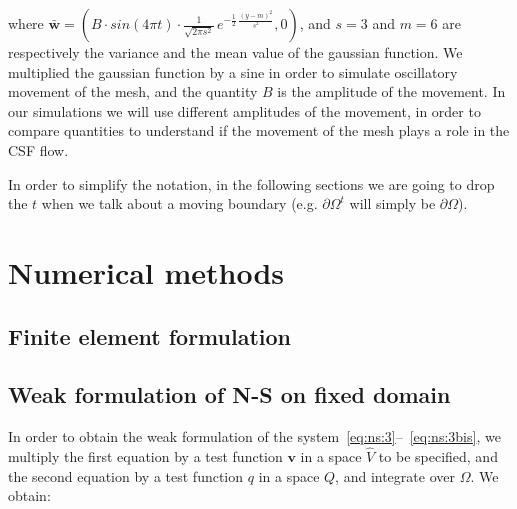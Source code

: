 \documentclass[a4paper,11pt,openright,twoside]{book}
\begin{document}
where $\bar{\mathbf{w}} = (B \cdot sin(4\pi t) \cdot \frac{1}{\sqrt{2 \pi s^2}} \, e^{- \frac{1}{2} \, \frac{(y - m)^2}{s^2}}  , 0)$, and $s = 3$ and $m = 6$ are respectively the variance and the mean value of the gaussian function. We multiplied the gaussian function by a sine in order to simulate oscillatory movement of the mesh, and the quantity $B$ is the amplitude of the movement. In our simulations we will use different amplitudes of the movement, in order to compare quantities to understand if the movement of the mesh plays a role in the CSF flow.

\begin{figure}


\end{figure}


In order to simplify the notation, in the following sections we are going to drop the $t$ when we talk about a moving boundary (e.g. $\partial \Omega^t$ will simply be $\partial \Omega$).




\chapter{Numerical methods}

\section{Finite element formulation}

\section{Weak formulation of N-S on fixed domain}

In order to obtain the weak formulation of the system~\eqref{eq:ns:3}--~\eqref{eq:ns:3bis}, we multiply the first equation by a test function $\mathbf{v}$ in a space $\hat{V}$ to be specified, and the second equation by a test function $q$ in a space $Q$, and integrate over $\Omega$. 
We obtain:
\end{document}
